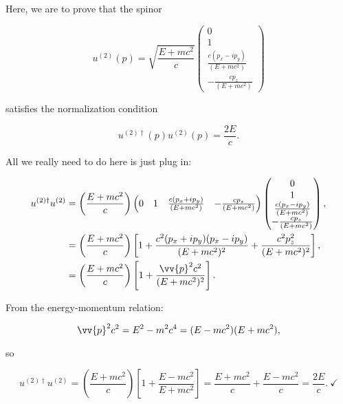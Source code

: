 \section{}

Here, we are to prove that the spinor 

\begin{equation}
    u^{(2)}(p) = \sqrt{\frac{E+mc^2}{c}}
        \begin{pmatrix}
            0 \\ 1 \\ \frac{c(p_x - ip_y)}{(E+mc^2)} \\ -\frac{cp_z}{(E+mc^2)}
        \end{pmatrix}
        \label{Prblm4Spinor}
\end{equation}

satisfies the normalization condition

\begin{equation}
    u^{(2)\dagger}(p)u^{(2)}(p) = \frac{2E}{c}.\label{Prblm4Normalization}
\end{equation}

All we really need to do here is just plug in:

\begin{align*}
    u^{(2)\dagger}u^{(2)} &= \left(\frac{E+mc^2}{c}\right) 
        \begin{pmatrix}
            0 & 1 & \frac{c(p_x + ip_y)}{(E+mc^2)} & -\frac{cp_z}{(E+mc^2)}
        \end{pmatrix}
        \begin{pmatrix}
            0 \\ 1 \\ \frac{c(p_x - ip_y)}{(E+mc^2)} \\ -\frac{cp_z}{(E+mc^2)}
        \end{pmatrix}, \\
    &= \left(\frac{E+mc^2}{c}\right)\left[1 + \frac{c^2(p_x + ip_y)(p_x - ip_y)}{(E+mc^2)^2} + \frac{c^2p_z^2}{(E+mc^2)^2}\right], \\
    &= \left(\frac{E+mc^2}{c}\right) \left[1 + \frac{\vv{p}^2c^2}{(E+mc^2)^2}\right].
\end{align*}

From the energy-momentum relation:

\begin{equation*}
    \vv{p}^2c^2 = E^2 - m^2c^4 = (E-mc^2)(E+mc^2),
\end{equation*}

so

\begin{equation*}
    u^{(2)\dagger}u^{(2)} = \left(\frac{E+mc^2}{c}\right) \left[1 + \frac{E-mc^2}{E+mc^2}\right] = \frac{E+mc^2}{c} + \frac{E-mc^2}{c} = \frac{2E}{c}.\ \checkmark
\end{equation*}
